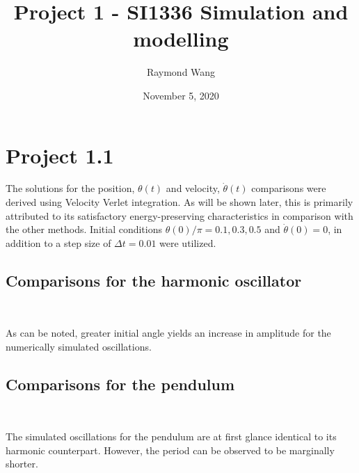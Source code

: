 \documentclass[12pt]{article}
\title{Project 1 - SI1336 Simulation and modelling}
\author{Raymond Wang}
\date{November 5, 2020}
\begin{document}
\maketitle
\newpage

\section*{Project 1.1}
The solutions for the position, $\theta(t)$ and velocity, $\dot{\theta}(t)$ comparisons were derived using Velocity Verlet integration. As will be shown later, this is primarily attributed to its satisfactory energy-preserving characteristics in comparison with the other methods. Initial conditions $\theta(0)/\pi = 0.1, 0.3, 0.5$ and  $\dot{\theta}(0) = 0$, in addition to a step size of $\Delta t = 0.01$ were utilized.
\subsection*{Comparisons for the harmonic oscillator}
\begin{figure*}[ht!]
\begin{center}
   \\
   \caption{\label{workflow} (a) $\theta(0)/\pi = 0.1$; (b) $\theta(0)/\pi = 0.3$; (c) $\theta(0)/\pi = 0.5$}
\end{center}
\end{figure*}

\noindent As can be noted, greater initial angle yields an increase in amplitude for the numerically simulated oscillations.
\subsection*{Comparisons for the pendulum}
\begin{figure*}[ht!]
\begin{center}
   \\
   \caption{\label{workflow}
   (a) $\theta(0)/\pi = 0.1$; (b) $\theta(0)/\pi = 0.3$; (c) $\theta(0)/\pi = 0.5$}
\end{center}
\end{figure*}
\noindent The simulated oscillations for the pendulum are at first glance identical to its harmonic counterpart. However, the period can be observed to be marginally shorter.
\end{document}
